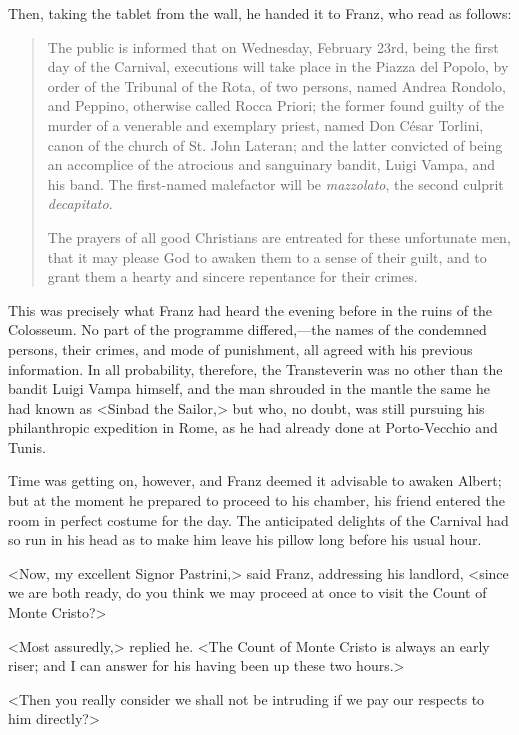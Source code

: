  Then, taking the tablet from the wall, he handed it to Franz, who read as follows: 

\begin{quotation}
The public is informed that on Wednesday, February 23rd, being the first day of the Carnival, executions will take place in the Piazza del Popolo, by order of the Tribunal of the Rota, of two persons, named Andrea Rondolo, and Peppino, otherwise called Rocca Priori; the former found guilty of the murder of a venerable and exemplary priest, named Don César Torlini, canon of the church of St. John Lateran; and the latter convicted of being an accomplice of the atrocious and sanguinary bandit, Luigi Vampa, and his band. The first-named malefactor will be \textit{mazzolato}, the second culprit \textit{decapitato}. 

The prayers of all good Christians are entreated for these unfortunate men, that it may please God to awaken them to a sense of their guilt, and to grant them a hearty and sincere repentance for their crimes.
\end{quotation}

 This was precisely what Franz had heard the evening before in the ruins of the Colosseum. No part of the programme differed,—the names of the condemned persons, their crimes, and mode of punishment, all agreed with his previous information. In all probability, therefore, the Transteverin was no other than the bandit Luigi Vampa himself, and the man shrouded in the mantle the same he had known as <Sinbad the Sailor,> but who, no doubt, was still pursuing his philanthropic expedition in Rome, as he had already done at Porto-Vecchio and Tunis. 

 Time was getting on, however, and Franz deemed it advisable to awaken Albert; but at the moment he prepared to proceed to his chamber, his friend entered the room in perfect costume for the day. The anticipated delights of the Carnival had so run in his head as to make him leave his pillow long before his usual hour. 

 <Now, my excellent Signor Pastrini,> said Franz, addressing his landlord, <since we are both ready, do you think we may proceed at once to visit the Count of Monte Cristo?> 

 <Most assuredly,> replied he. <The Count of Monte Cristo is always an early riser; and I can answer for his having been up these two hours.> 

 <Then you really consider we shall not be intruding if we pay our respects to him directly?>

